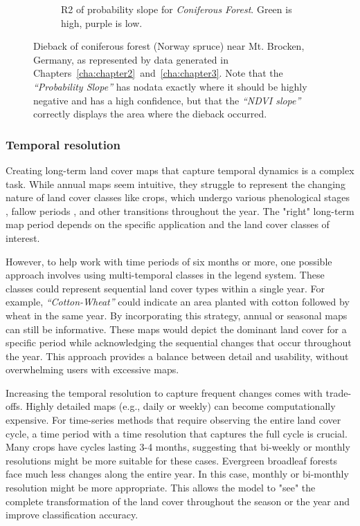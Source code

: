 \begin{figure}[H]
\begin{subfigure}[t]{0.24\textwidth}
        \caption{R2 of probability slope for \textit{Coniferous Forest}. Green is high, purple is low.}
        \label{fig:brocken_pslope_r2}
        \end{subfigure}
        \caption{Dieback of coniferous forest (Norway spruce) near Mt. Brocken, Germany, as represented by data generated in Chapters\@~\ref{cha:chapter2}\@~and\@~\ref{cha:chapter3}. Note that the \textit{``Probability Slope''} has nodata exactly where it should be highly negative and has a high confidence, but that the \textit{``NDVI slope''} correctly displays the area where the dieback occurred.}
        \label{fig:brocken_slope_analysis}
        \end{figure}

        \subsubsection{Temporal resolution}

        Creating long-term land cover maps that capture temporal dynamics is a complex task. While annual maps seem intuitive, they struggle to represent the changing nature of land cover classes like crops, which undergo various phenological stages \citep{russwurm2023end}, fallow periods \citep{tong2020forgotten}, and other transitions \citep{rodriguez2024classification} throughout the year. The "right" long-term map period depends on the specific application and the land cover classes of interest. 
        
        However, to help work with time periods of six months or more, one possible approach involves using multi-temporal classes in the legend system. These classes could represent sequential land cover types within a single year. For example, \emph{``Cotton-Wheat''} could indicate an area planted with cotton followed by wheat in the same year. By incorporating this strategy, annual or seasonal maps can still be informative. These maps would depict the dominant land cover for a specific period while acknowledging the sequential changes that occur throughout the year. This approach provides a balance between detail and usability, without overwhelming users with excessive maps.
                
        Increasing the temporal resolution to capture frequent changes comes with trade-offs. Highly detailed maps (e.g., daily or weekly) can become computationally expensive. For time-series methods that require observing the entire land cover cycle, a time period with a time resolution that captures the full cycle is crucial. Many crops have cycles lasting 3-4 months, suggesting that bi-weekly or monthly resolutions might be more suitable for these cases. Evergreen broadleaf forests face much less changes along the entire year. In this case, monthly or bi-monthly resolution might be more appropriate. This allows the model to "see" the complete transformation of the land cover throughout the season or the year and improve classification accuracy. 

